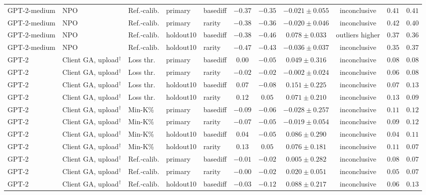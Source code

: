 {\begin{longtable}{@{\extracolsep{\fill}}lllllcccccc@{}}
GPT-2-medium & NPO & Ref.-calib. & primary & basediff & $-0.37$ & $-0.35$ & $-0.021 \pm 0.055$ & inconclusive & $0.41$ & $0.41$ \\
GPT-2-medium & NPO & Ref.-calib. & primary & rarity & $-0.38$ & $-0.36$ & $-0.020 \pm 0.046$ & inconclusive & $0.42$ & $0.40$ \\
GPT-2-medium & NPO & Ref.-calib. & holdout10 & basediff & $-0.38$ & $-0.46$ & $0.078 \pm 0.033$ & outliers higher & $0.37$ & $0.36$ \\
GPT-2-medium & NPO & Ref.-calib. & holdout10 & rarity & $-0.47$ & $-0.43$ & $-0.036 \pm 0.037$ & inconclusive & $0.35$ & $0.37$ \\
GPT-2 & Client GA, upload$^{\dagger}$ & Loss thr. & primary & basediff & $0.00$ & $-0.05$ & $0.049 \pm 0.316$ & inconclusive & $0.08$ & $0.08$ \\
GPT-2 & Client GA, upload$^{\dagger}$ & Loss thr. & primary & rarity & $-0.02$ & $-0.02$ & $-0.002 \pm 0.024$ & inconclusive & $0.06$ & $0.08$ \\
GPT-2 & Client GA, upload$^{\dagger}$ & Loss thr. & holdout10 & basediff & $0.07$ & $-0.08$ & $0.151 \pm 0.225$ & inconclusive & $0.07$ & $0.13$ \\
GPT-2 & Client GA, upload$^{\dagger}$ & Loss thr. & holdout10 & rarity & $0.12$ & $0.05$ & $0.071 \pm 0.210$ & inconclusive & $0.13$ & $0.09$ \\
GPT-2 & Client GA, upload$^{\dagger}$ & Min-K\% & primary & basediff & $-0.09$ & $-0.06$ & $-0.028 \pm 0.257$ & inconclusive & $0.11$ & $0.12$ \\
GPT-2 & Client GA, upload$^{\dagger}$ & Min-K\% & primary & rarity & $-0.07$ & $-0.05$ & $-0.019 \pm 0.054$ & inconclusive & $0.09$ & $0.12$ \\
GPT-2 & Client GA, upload$^{\dagger}$ & Min-K\% & holdout10 & basediff & $0.04$ & $-0.05$ & $0.086 \pm 0.290$ & inconclusive & $0.04$ & $0.11$ \\
GPT-2 & Client GA, upload$^{\dagger}$ & Min-K\% & holdout10 & rarity & $0.13$ & $0.05$ & $0.076 \pm 0.181$ & inconclusive & $0.11$ & $0.07$ \\
GPT-2 & Client GA, upload$^{\dagger}$ & Ref.-calib. & primary & basediff & $-0.01$ & $-0.02$ & $0.005 \pm 0.282$ & inconclusive & $0.08$ & $0.07$ \\
GPT-2 & Client GA, upload$^{\dagger}$ & Ref.-calib. & primary & rarity & $-0.00$ & $-0.02$ & $0.020 \pm 0.051$ & inconclusive & $0.05$ & $0.07$ \\
GPT-2 & Client GA, upload$^{\dagger}$ & Ref.-calib. & holdout10 & basediff & $-0.03$ & $-0.12$ & $0.088 \pm 0.217$ & inconclusive & $0.06$ & $0.13$ \\

\end{longtable}}

